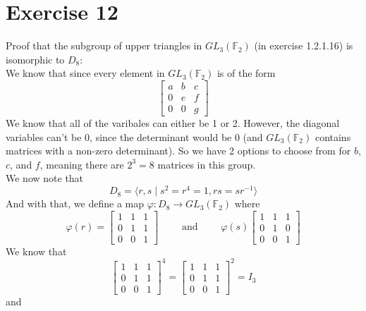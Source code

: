 \documentclass[12pt]{article}
\newcommand{\F}{\mathbb{F}}
\begin{document}
    \section*{Exercise 12}
    Proof that the subgroup of upper triangles in $GL_3(\F_2)$
    (in exercise 1.2.1.16) is isomorphic to $D_8$: \\
    We know that since every element in $GL_3(\F_2)$
    is of the form
    \[ \begin{bmatrix} a & b & c \\
        0 & e & f \\
        0 & 0 & g \end{bmatrix} \]
    We know that all of the varibales can either be 1 or 2.
    However, the diagonal variables can't be 0,
    since the determinant would be 0
    (and $GL_3(\F_2)$ contains matrices with a non-zero determinant).
    So we have 2 options to choose from for $b$, $c$, and $f$,
    meaning there are $2^3 = 8$ matrices in this group. \\
    We now note that 
    \[ D_{8} = \langle r, s \mid s^2 = r^4 = 1, rs = sr^{-1} \rangle \]
    And with that, we define a map
    $\varphi: D_8 \to GL_3(\F_2)$
    where
    \[ \varphi(r) = \begin{bmatrix} 1 & 1 & 1 \\
        0 & 1 & 1 \\
        0 & 0 & 1 \end{bmatrix} \qquad
        \text{ and } \qquad
    \varphi(s) \begin{bmatrix} 1 & 1 & 1 \\
        0 & 1 & 0 \\
        0 & 0 & 1 \end{bmatrix} \]
    We know that
    \[ \begin{bmatrix} 1 & 1 & 1 \\
        0 & 1 & 1 \\
        0 & 0 & 1 \end{bmatrix}^4
    = \begin{bmatrix} 1 & 1 & 1 \\
        0 & 1 & 1 \\
        0 & 0 & 1 \end{bmatrix}^2 = I_3 \] 
    and
\end{document}
